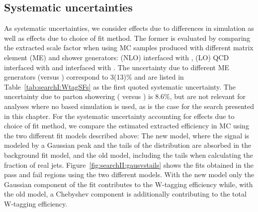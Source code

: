 \subsection{Systematic uncertainties}
\label{sec:searchI:wtagsystematic}
As systematic uncertainties, we consider effects due to differences in \ttbar simulation as well as effects due to choice of fit method. The former is evaluated by comparing the extracted scale factor when using \ttbar MC samples produced with different matrix element (ME) and shower generators: \POWHEG (NLO) interfaced with  , \MADGRAPH (LO) QCD interfaced with \HERWIG{++} and \POWHEG interfaced with \HERWIG{++}.
The uncertainty due to different ME generators (\POWHEG versus \MADGRAPH) correspond to 3(13)\% and are listed in Table~\ref{tab:searchI:WtagSFs} as the first quoted systematic uncertainty. The uncertainty due to parton showering ( versus \HERWIG{++}) is 8.6\%, but are not relevant for analyses where no \HERWIG{++} based simulation is used, as is the case for the search presented in this chapter. 
For the systematic uncertainty accounting for effects due to choice of fit method, we compare the estimated extracted efficiency in \ttbar MC using the two different fit models described above: The new model, where the signal is modeled by a Gaussian peak and the tails of the distribution are absorbed in the background fit model, and the old model, including the tails when calculating the fraction of real \PW jets. Figure~\ref{fig:searchII:gausvstails} shows the fits obtained in the pass and fail regions using the two different models. With the new model only the Gaussian component of the fit contributes to the W-tagging efficiency while, with the old model, a Chebyshev component is additionally contributing to the total W-tagging efficiency.
